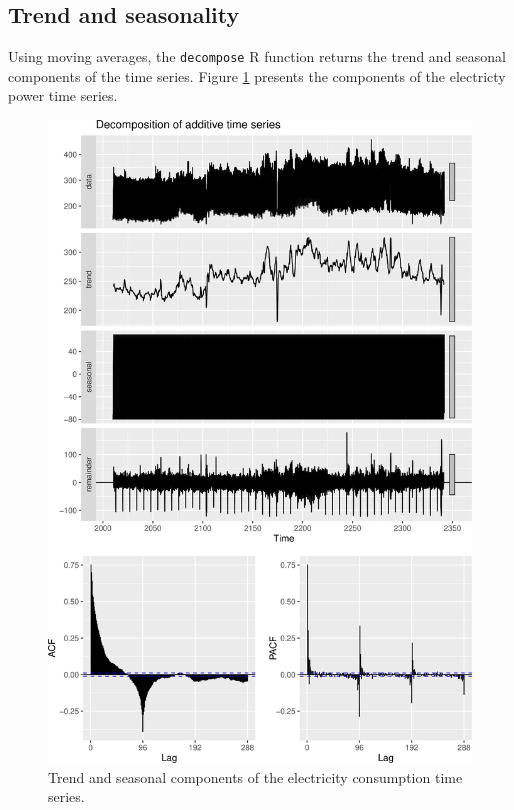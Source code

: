 \subsection{Trend and seasonality}
Using moving averages, the \texttt{decompose} R function returns the trend and seasonal components 
of the time series. Figure \ref{figure_decompose} presents the components of the electricty power 
time series. 

\begin{figure}[H]
\centering
 \includegraphics[scale=0.5]{figures/decompose.png}
\caption{Trend and seasonal components of the electricity consumption time series.}
\label{figure_decompose}
\end{figure}

